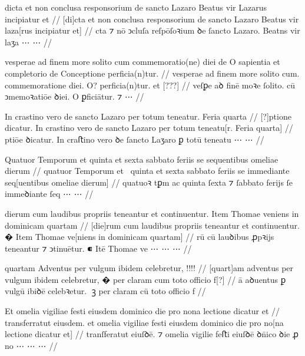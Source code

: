 \ex \bg
\gla
{}
dicta et non conclusa responsorium de sancto Lazaro Beatus vir Lazarus
incipiatur et 
//
\glRekonstrukcja
{}
[di]cta et non conclusa responsorium de sancto Lazaro Beatus vir laza[rus
incipiatur et] 
//
\glU
{}
cta ⁊ nō ↄcluſa reſpōſoꝛium ꝺe ſancto Lazaro. Beatns vir laʒa ⋯ ⋯
//
\endgl
\xe



\ex \bg
\gla
{}
vesperae ad finem more solito cum commemoratio(ne) diei
de O sapientia et completorio de Conceptione perficia(n)tur.
//
\glRekonstrukcja
{}
vesperae ad finem more solito cum. commemoratione diei.
{} O? {} {} {} {} perficia(n)tur. et
[???]
//
\glU
{}
veſꝑe aꝺ finē moꝛe ſolito. cū ↄmemoꝛatiōe ꝺiei. {} O {} {} {} {} ꝑficiātur. ⁊ ⋯
//
\endgl
\xe



\ex \bg
\gla
{}
{} {} In crastino vero de sancto Lazaro per totum teneatur.
Feria quarta 
//
\glRekonstrukcja
{}
[?]ptione dicatur.
In crastino vero de sancto Lazaro per totum teneatu[r.
Feria quarta] 
//
\glU
{}
ptiōe ꝺicatur. In craﬅino vero ꝺe ſancto Laʒaro ꝑ totū teneatu ⋯ ⋯
//
\endgl
\xe



\ex \bg
\gla
{}
Quatuor Temporum et quinta et sexta sabbato feriis se
{} sequentibus omeliae dierum
//
\glRekonstrukcja
{}
quatuor Temporum et~ quinta et sexta sabbato feriis se
immediante seq[uentibus omeliae dierum]
//
\glU
{}
quatuoꝛ tꝑm ac quinta {} ſexta ⁊ ſabbato ferijs ſe immeꝺiante ſeq ⋯ ⋯
//
\endgl
\xe



\ex \bg
\gla
{}
dierum cum laudibus propriis teneantur et continuentur.
{} Item Thomae veniens in dominicam quartam
//
\glRekonstrukcja
{}
[die]rum cum laudibus propriis teneantur et continuentur.
� Item Thomae ve[niens in dominicam quartam]
//
\glU
{}
rū cū lauꝺibus ꝓpꝛijs teneantur ⁊ ↄtinuētur. ⁌ Itē Thomae ve ⋯ ⋯ ⋯
//
\endgl
\xe


\ex \bg
\gla
{}
quartam Adventus per vulgum
ibidem celebretur, !!!!
//
\glRekonstrukcja
{}
[quart]am adventus per vulgum
ibidem celebretur, � per claram cum toto officio f[?]
//
\glU
{}
ā aꝺuentus ꝑ vulgū ibiꝺē celebꝛetur. ꝫ per claram cū toto oﬀicio f
//
\endgl
\xe




\ex \bg
\gla
{}
{} {}  Et omelia vigiliae festi eiusdem dominico die pro nona
lectione dicatur et 
//
\glRekonstrukcja
{}
transferratut eiusdem. et omelia vigiliae festi eiusdem dominico die pro no[na
lectione dicatur et]
//
\glU
{}
tranſferatut eiuſꝺē. ⁊ omelia vigilie feﬅi eiuſꝺē ꝺn̄ico ꝺie ꝓ no ⋯ ⋯ ⋯
//
\endgl
\xe


